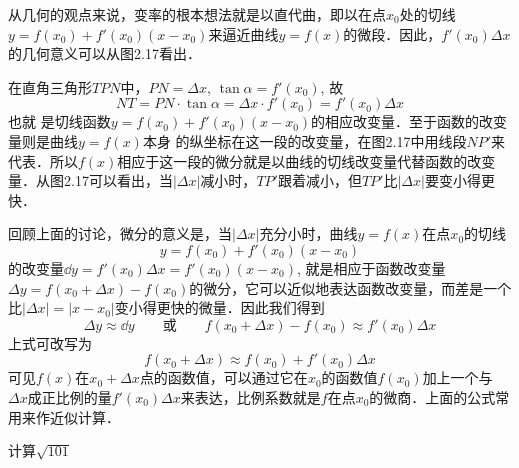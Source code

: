 从几何的观点来说，变率的根本想法就是以直代曲，即以在点$x_0$处的切线$y=f(x_0)+f'(x_0)(x-x_0)$来逼近曲线$y=f(x)$的微段．因此，$f'(x_0)\Delta x$的几何意义可以从图2.17看出．

\begin{figure}[htp]
    \centering
    \caption{}
\end{figure}

在直角三角形$TPN$中，$PN=\Delta x$, $\tan\alpha=f'(x_0)$, 故
\[NT=PN\cdot \tan\alpha=\Delta x\cdot f'(x_0)=f'(x_0)\Delta x\]
也就
是切线函数$y=f (x_0) +f' (x_0) (x-x_0)$的相应改变量．至于函数的改变量则是曲线$y=f(x)$本身
的纵坐标在这一段的改变量，在图2.17中用线段$NP'$来代表．所以$f(x)$相应于这一段的微分就是以曲线的切线改变量代替函数的改变量．从图2.17可以看出，当$|\Delta x|$减小时，$TP'$跟着减小，但$TP'$比$|\Delta x|$要变小得更快．

回顾上面的讨论，微分的意义是，当$|\Delta x|$充分小时，曲线$y=f(x)$在点$x_0$的切线
\[y=f (x_0) +f' (x_0) (x-x_0)\]
的改变量$\dd y=f'(x_0)\Delta x=f'(x_0)(x-x_0)$, 就是相应于函数改变量$\Delta y=f(x_0+\Delta x)-f(x_0)$的微分，它可以近似地表达函数改变量，而差是一个比$|\Delta x|=|x-x_0|$变小得更快的微量．因此我们得到
\[\Delta y\approx \dd y\qquad \text{或}\qquad f(x_0+\Delta x)-f(x_0)\approx f'(x_0)\Delta x\]
上式可改写为
\[f (x_0+\Delta x) \approx f (x_0) +f' (x_0) \Delta x\]
可见$f(x)$在$x_0+\Delta x$点的函数值，可以通过它在$x_0$的函数值$f(x_0)$加上一个与$\Delta x$成正比例的量$f'(x_0)\Delta x$来表达，比例系数就是$f$在点$x_0$的微商．上面的公式常用来作近似计算．

\begin{example}
    计算$\sqrt{101}$
\end{example}



